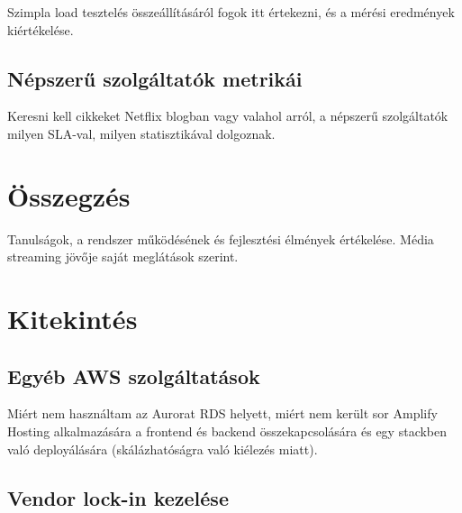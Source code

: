 Szimpla load tesztelés összeállításáról fogok itt értekezni, és a mérési eredmények kiértékelése.

\section{Népszerű szolgáltatók metrikái}

Keresni kell cikkeket Netflix blogban vagy valahol arról, a népszerű szolgáltatók milyen SLA-val, milyen statisztikával dolgoznak.

\chapter{Összegzés}

Tanulságok, a rendszer működésének és fejlesztési élmények értékelése. Média streaming jövője saját meglátások szerint.

\chapter{Kitekintés}

\section{Egyéb AWS szolgáltatások}

Miért nem használtam az Aurorat RDS helyett, miért nem került sor Amplify Hosting alkalmazására a frontend és backend összekapcsolására és egy stackben való deployálására (skálázhatóságra való kiélezés miatt).

\section{Vendor lock-in kezelése}
